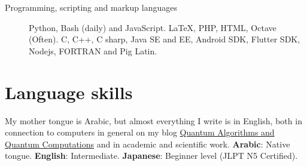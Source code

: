 \documentclass[margin,line,a4paper]{resume}
\begin{document}
\begin{resume}
\begin{description}
    \item[Programming, scripting and markup languages] Python, Bash (daily) and JavaScript. \LaTeX, PHP, HTML, Octave (Often). C, C++, C sharp, Java SE and EE, Android SDK, Flutter SDK, Nodejs, FORTRAN and Pig Latin.
\end{description}
    

\section{\mysidestyle Language skills}
    My mother tongue is Arabic, but almost everything I write is in English, both in connection to computers in general on my blog \href{https://qaqcblog.quora.com/}{Quantum Algorithms and Quantum Computations} and in academic and scientific work. \textbf{Arabic}: Native tongue. \textbf{English}: Intermediate. \textbf{Japanese}: Beginner level (JLPT N5 Certified).
   






















\end{resume}
\end{document}
